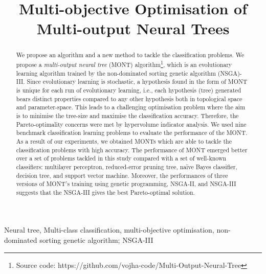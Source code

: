 \documentclass[conference]{IEEEtran}
\begin{document}
\title{Multi-objective Optimisation of Multi-output Neural Trees}

\author{
\and
{}
 }


\maketitle

\begin{abstract}
We propose an algorithm and a new method to tackle the classification problems. We propose a \textit{multi-output neural tree} (MONT) algorithm\footnote{Source code: https://github.com/vojha-code/Multi-Output-Neural-Tree}, which is an evolutionary learning algorithm trained by the non-dominated sorting genetic algorithm (NSGA)-III. Since evolutionary learning is stochastic, a hypothesis found in the form of MONT is unique for each run of evolutionary learning, i.e., each hypothesis (tree) generated bears distinct properties compared to any other hypothesis both in topological space and parameter-space. This leads to a challenging optimisation problem where the aim is to minimise the tree-size and maximise the classification accuracy. Therefore, the Pareto-optimality concerns were met by hypervolume indicator analysis. We used nine benchmark classification learning problems to evaluate the performance of the MONT. As a result of our experiments, we obtained MONTs which are able to tackle the classification problems with high accuracy. The performance of MONT emerged better over a set of problems tackled in this study compared with a set of well-known classifiers: multilayer perceptron, reduced-error pruning tree, na\"{i}ve Bayes classifier, decision tree, and support vector machine. Moreover, the performances of three versions of MONT's training using genetic programming, NSGA-II, and NSGA-III suggests that the NSGA-III gives the best Pareto-optimal solution. \end{abstract}

\begin{IEEEkeywords}
Neural tree, Multi-class classification, multi-objective optimisation, non-dominated sorting genetic algorithm; NSGA-III
\end{IEEEkeywords}
\end{document}
